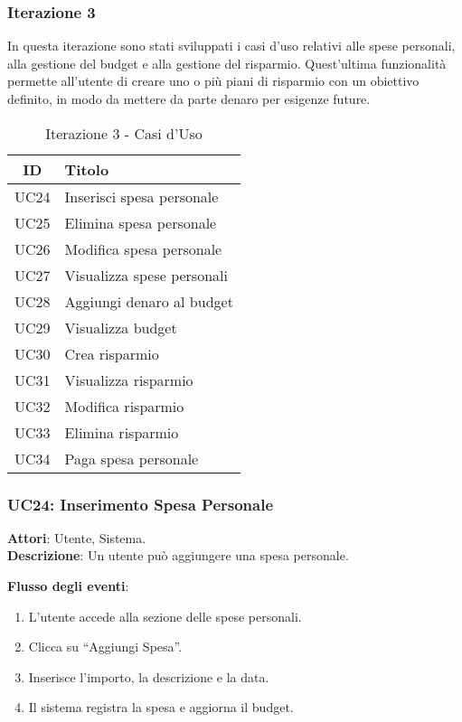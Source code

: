 \subsubsection{Iterazione 3}
In questa iterazione sono stati sviluppati i casi d’uso relativi alle spese personali, alla gestione del budget e alla gestione del risparmio. Quest’ultima funzionalità permette all’utente di creare uno o più piani di risparmio con un obiettivo definito, in modo da mettere da parte denaro per esigenze future.

\begin{table}[h]
    \centering
    \begin{tabular}{|c|l|}
    \hline
    \textbf{ID} & \textbf{Titolo} \\ \hline
    UC24 & Inserisci spesa personale \\ \hline
    UC25 & Elimina spesa personale \\ \hline
    UC26 & Modifica spesa personale \\ \hline
    UC27 & Visualizza spese personali \\ \hline
    UC28 & Aggiungi denaro al budget \\ \hline
    UC29 & Visualizza budget \\ \hline
    UC30 & Crea risparmio \\ \hline
    UC31 & Visualizza risparmio \\ \hline
    UC32 & Modifica risparmio \\ \hline
    UC33 & Elimina risparmio \\ \hline
    UC34 & Paga spesa personale \\ \hline
    \end{tabular}
    \caption{Iterazione 3 - Casi d’Uso}
\end{table}

\subsubsection{UC24: Inserimento Spesa Personale}
\textbf{Attori}: Utente, Sistema. \\
\textbf{Descrizione}: Un utente può aggiungere una spesa personale.

\textbf{Flusso degli eventi}:
\begin{enumerate}
    \item L’utente accede alla sezione delle spese personali.
    \item Clicca su ``Aggiungi Spesa''.
    \item Inserisce l’importo, la descrizione e la data.
    \item Il sistema registra la spesa e aggiorna il budget.
\end{enumerate}

